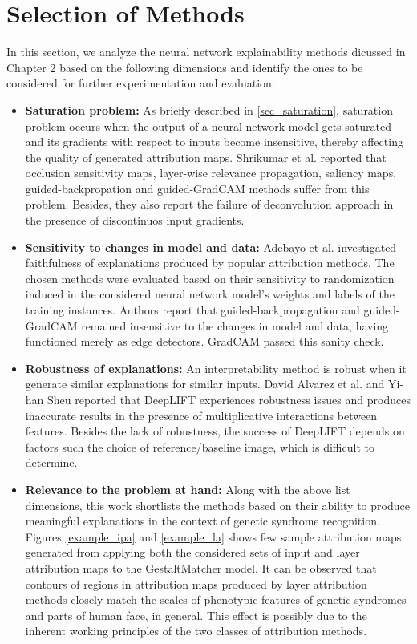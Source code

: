 \documentclass[../report.tex]{subfiles}
\begin{document}
    \section{Selection of Methods}\label{sec_method_selection}
    In this section, we analyze the neural network explainability methods dicussed in Chapter 2 based on the following dimensions and identify the ones to be considered for further experimentation and evaluation:
    \begin{itemize}
    	\item \textbf{Saturation problem:} As briefly described in \ref{sec_saturation}, saturation problem occurs when the output of a neural network model gets saturated and its gradients with respect to inputs become insensitive, thereby affecting the quality of generated attribution maps. Shrikumar et al. \cite{shrikumar2017learning} reported that occlusion sensitivity maps, layer-wise relevance propagation, saliency maps, guided-backpropation and guided-GradCAM methods suffer from this problem. Besides, they also report the failure of deconvolution approach in the presence of discontinuos input gradients.   
    	\item \textbf{Sensitivity to changes in model and data:} Adebayo et al. \cite{adebayo2018sanity} investigated faithfulness of explanations produced by popular attribution methods. The chosen methods were evaluated based on their sensitivity to randomization induced in the considered neural network model's weights and labels of the training instances. Authors report that guided-backpropagation and guided-GradCAM remained insensitive to the changes in model and data, having functioned merely as edge detectors. GradCAM passed this sanity check.
    	\item \textbf{Robustness of explanations:} An interpretability method is robust when it generate similar explanations for similar inputs. David Alvarez et al. \cite{alvarez2018robustness} and Yi-han Sheu \cite{sheu2020illuminating} reported that DeepLIFT experiences robustness issues and produces inaccurate results in the presence of multiplicative interactions between features. Besides the lack of robustness, the success of DeepLIFT depends on factors such the choice of reference/baseline image, which is difficult to determine. 
    	\item \textbf{Relevance to the problem at hand:} Along with the above list dimensions, this work shortlists the methods based on their ability to produce meaningful explanations in the context of genetic syndrome recognition. Figures \ref{example_ipa} and \ref{example_la}  shows few sample attribution maps generated from applying both the considered sets of input and layer attribution maps to the GestaltMatcher model. It can be observed that contours of regions in attribution maps produced by layer attribution methods closely match the scales of phenotypic features of genetic syndromes and parts of human face, in general. This effect is possibly due to the inherent working principles of the two classes of attribution methods.\\

\end{itemize}
\end{document}

